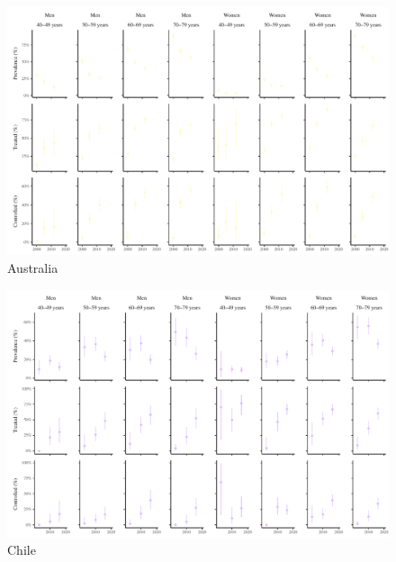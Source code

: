 \documentclass[12pt]{article}
\begin{document}
\begin{appendix}
\begin{refsection}
\begin{landscape}
        \begin{figure}[H]
            \centering
            \includegraphics[width=\linewidth]{../3_figures/countries/fig_australia.pdf}
            \caption{Australia}
            \label{fig:australia}
        \end{figure}
    
        \begin{figure}[H]
            \centering
            \includegraphics[width=\linewidth]{../3_figures/countries/fig_chile.pdf}
            \caption{Chile}
            \label{fig:chile}
        \end{figure}
    
    

\end{landscape}
\end{refsection}
\end{appendix}
\end{document}
